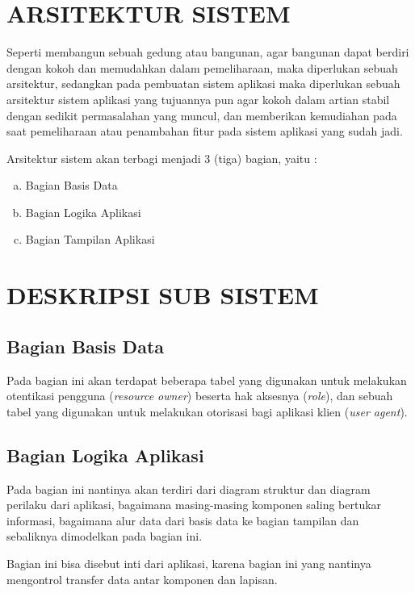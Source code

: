\documentclass[pdftex,12pt, oneside]{article}
\begin{document}
\section{ARSITEKTUR SISTEM}


Seperti membangun sebuah gedung atau bangunan, agar bangunan dapat berdiri dengan kokoh dan memudahkan dalam pemeliharaan, maka diperlukan sebuah arsitektur, sedangkan pada pembuatan sistem aplikasi maka diperlukan sebuah arsitektur sistem aplikasi yang tujuannya pun agar kokoh dalam artian stabil dengan sedikit permasalahan yang muncul, dan memberikan kemudiahan pada saat pemeliharaan atau penambahan fitur pada sistem aplikasi yang sudah jadi.

Arsitektur sistem akan terbagi menjadi 3 (tiga) bagian, yaitu :

\begin{enumerate}[a.] 
	\item Bagian Basis Data
	\item Bagian Logika Aplikasi
	\item Bagian Tampilan Aplikasi
\end{enumerate}

\section{DESKRIPSI SUB SISTEM}

\subsection{Bagian Basis Data}

Pada bagian ini akan terdapat beberapa tabel yang digunakan untuk melakukan otentikasi pengguna (\textit{resource owner}) beserta hak aksesnya (\textit{role}), dan sebuah tabel yang digunakan untuk melakukan otorisasi bagi aplikasi klien (\textit{user agent}).

\subsection{Bagian Logika Aplikasi}

Pada bagian ini nantinya akan terdiri dari diagram struktur dan diagram perilaku dari aplikasi, bagaimana masing-masing komponen saling bertukar informasi, bagaimana alur data dari basis data ke bagian tampilan dan sebaliknya dimodelkan pada bagian ini.

Bagian ini bisa disebut inti dari aplikasi, karena bagian ini yang nantinya mengontrol transfer data antar komponen dan lapisan.
\end{document}
